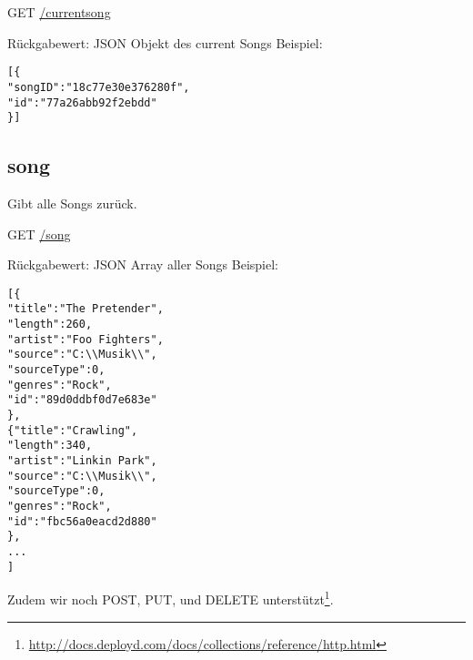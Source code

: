 GET
\url{/currentsong}

Rückgabewert: JSON Objekt des current Songs
Beispiel:
\begin{lstlisting}
[{
"songID":"18c77e30e376280f",
"id":"77a26abb92f2ebdd"
}]
\end{lstlisting}

\subsection{song}
\label{service:song}
Gibt alle Songs zurück.

GET
\url{/song}

Rückgabewert: JSON Array aller Songs
Beispiel:
\begin{lstlisting}
[{
"title":"The Pretender",
"length":260,
"artist":"Foo Fighters",
"source":"C:\\Musik\\",
"sourceType":0,
"genres":"Rock",
"id":"89d0ddbf0d7e683e"
},
{"title":"Crawling",
"length":340,
"artist":"Linkin Park",
"source":"C:\\Musik\\",
"sourceType":0,
"genres":"Rock",
"id":"fbc56a0eacd2d880"
},
...
]
\end{lstlisting}



Zudem wir noch POST, PUT, und DELETE unterstützt\footnote{\url{http://docs.deployd.com/docs/collections/reference/http.html}}.


